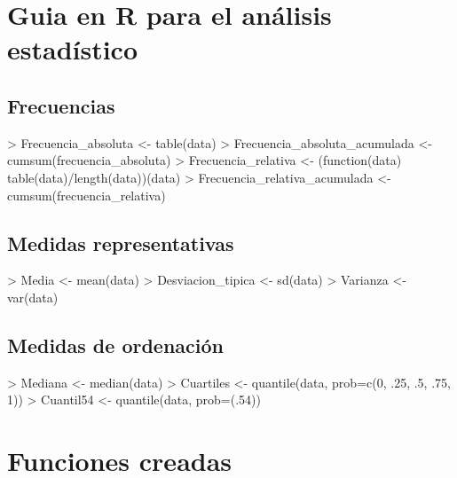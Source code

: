 \documentclass [a4paper] {article}
\begin{document}
\section{Guia en R para el análisis estadístico}
\subsection{Frecuencias}
\begin{Schunk}
\begin{Sinput}
> Frecuencia_absoluta <- table(data)
> Frecuencia_absoluta_acumulada <- cumsum(frecuencia_absoluta)
> Frecuencia_relativa <- (function(data) table(data)/length(data))(data)
> Frecuencia_relativa_acumulada <- cumsum(frecuencia_relativa)
\end{Sinput}
\end{Schunk}
\subsection{Medidas representativas}
\begin{Schunk}
\begin{Sinput}
> Media <- mean(data)
> Desviacion_tipica <- sd(data)
> Varianza <- var(data)
\end{Sinput}
\end{Schunk}
\subsection{Medidas de ordenación}
\begin{Schunk}
\begin{Sinput}
> Mediana <- median(data)
> Cuartiles <- quantile(data, prob=c(0, .25, .5, .75, 1))
> Cuantil54 <- quantile(data, prob=(.54))
\end{Sinput}
\end{Schunk}

\section{Funciones creadas}
\end{document}
